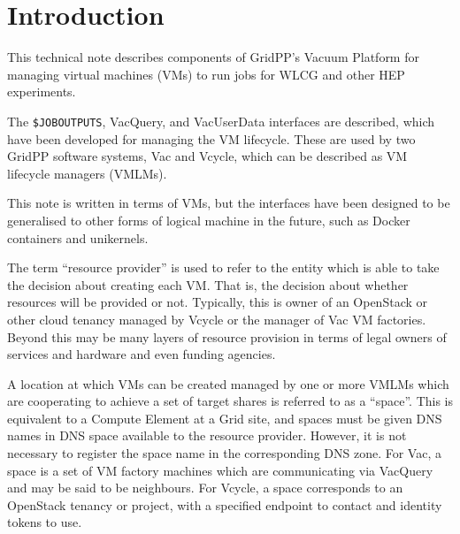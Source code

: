 \documentclass[12pt,a4paper]{article}
\begin{document}
\cleardoublepage

\renewcommand{\thefootnote}{\arabic{footnote}}
\setcounter{footnote}{0}


\pagestyle{plain} %
\setcounter{page}{1}

\linenumbers

\section{Introduction}
\label{sec:Introduction}

This technical note describes components of GridPP's Vacuum Platform for 
managing virtual machines (VMs) to run jobs for WLCG and other HEP 
experiments.

The \texttt{\$JOBOUTPUTS}, VacQuery, and VacUserData interfaces are described, 
which have been developed for managing the VM lifecycle. These are used 
by two GridPP software systems, Vac and Vcycle, which can be described 
as VM lifecycle managers (VMLMs).

This note is written in terms of VMs, but the interfaces have been 
designed to be generalised to other forms of logical machine in the
future, such as Docker containers and unikernels.

The term ``resource provider'' is used to refer to the entity which is 
able to take the decision about creating each VM. That is, the decision 
about whether resources will be provided or not. Typically, this is owner 
of an OpenStack or other cloud tenancy managed by Vcycle or the manager of Vac VM 
factories. Beyond this may be many layers of resource provision
in terms of legal owners of services and hardware and even funding agencies.

A location at which VMs can be created managed by one or more VMLMs
which are cooperating to achieve a set of target shares is referred to
as a ``space''. This is equivalent to a Compute Element at a Grid site,
and spaces must be given DNS names in DNS space available to the
resource provider. However, it is not necessary to register the 
space name in the corresponding DNS zone. For Vac, a space is a set
of VM factory machines which are communicating via VacQuery and may
be said to be neighbours. For Vcycle, a space corresponds to an 
OpenStack tenancy or project, with a specified endpoint to contact
and identity tokens to use.
\end{document}

